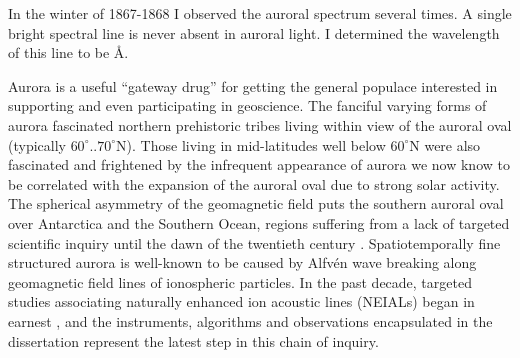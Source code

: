 
\setlength{\epigraphwidth}{0.85\textwidth}
\epigraph{In the winter of 1867-1868 I observed the auroral spectrum several times. A single bright spectral line is never absent in auroral light. I determined the wavelength of this line to be \unit[5567]{\AA}.}{\citep{angstrom1869}}

\graphicspath{{Intro/}}
Aurora is a useful ``gateway drug'' for getting the general populace interested in supporting and even participating in geoscience.
The fanciful varying forms of aurora fascinated northern prehistoric tribes living within view of the auroral oval (typically $60^\circ..70^\circ$N).
Those living in mid-latitudes well below $60^\circ$N were also fascinated and frightened by the infrequent appearance of aurora we now know to be correlated with the expansion of the auroral oval due to strong solar activity.
The spherical asymmetry of the geomagnetic field puts the southern auroral oval over Antarctica and the Southern Ocean, regions suffering from a lack of targeted scientific inquiry until the dawn of the twentieth century \citep{davies1931}. 
Spatiotemporally fine structured aurora is well-known to be caused by Alfvén wave breaking along geomagnetic field lines of ionospheric particles.
In the past decade, targeted studies associating naturally enhanced ion acoustic lines (NEIALs) began in earnest \citep{michell2005}, and the instruments, algorithms and observations encapsulated in the dissertation represent the latest step in this chain of inquiry.

